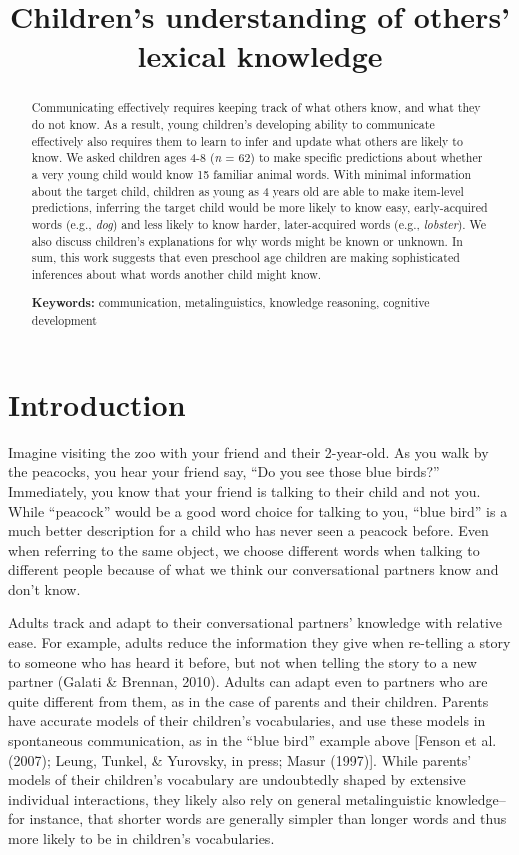 \documentclass[10pt, letterpaper]{article}
\title{Children's understanding of others' lexical knowledge}
\begin{document}
\maketitle

\begin{abstract}
Communicating effectively requires keeping track of what others know,
and what they do not know. As a result, young children's developing
ability to communicate effectively also requires them to learn to infer
and update what others are likely to know. We asked children ages 4-8
(\emph{n} = 62) to make specific predictions about whether a very young
child would know 15 familiar animal words. With minimal information
about the target child, children as young as 4 years old are able to
make item-level predictions, inferring the target child would be more
likely to know easy, early-acquired words (e.g., \emph{dog}) and less
likely to know harder, later-acquired words (e.g., \emph{lobster}). We
also discuss children's explanations for why words might be known or
unknown. In sum, this work suggests that even preschool age children are
making sophisticated inferences about what words another child might
know.

\textbf{Keywords:}
communication, metalinguistics, knowledge reasoning, cognitive
development
\end{abstract}

\hypertarget{introduction}{%
\section{Introduction}\label{introduction}}

Imagine visiting the zoo with your friend and their 2-year-old. As you
walk by the peacocks, you hear your friend say, ``Do you see those blue
birds?'' Immediately, you know that your friend is talking to their
child and not you. While ``peacock'' would be a good word choice for
talking to you, ``blue bird'' is a much better description for a child
who has never seen a peacock before. Even when referring to the same
object, we choose different words when talking to different people
because of what we think our conversational partners know and don't
know.

Adults track and adapt to their conversational partners' knowledge with
relative ease. For example, adults reduce the information they give when
re-telling a story to someone who has heard it before, but not when
telling the story to a new partner (Galati \& Brennan, 2010). Adults can
adapt even to partners who are quite different from them, as in the case
of parents and their children. Parents have accurate models of their
children's vocabularies, and use these models in spontaneous
communication, as in the ``blue bird'' example above {[}Fenson et al.
(2007); Leung, Tunkel, \& Yurovsky, in press; Masur (1997){]}. While
parents' models of their children's vocabulary are undoubtedly shaped by
extensive individual interactions, they likely also rely on general
metalinguistic knowledge--for instance, that shorter words are generally
simpler than longer words and thus more likely to be in children's
vocabularies.
\end{document}
